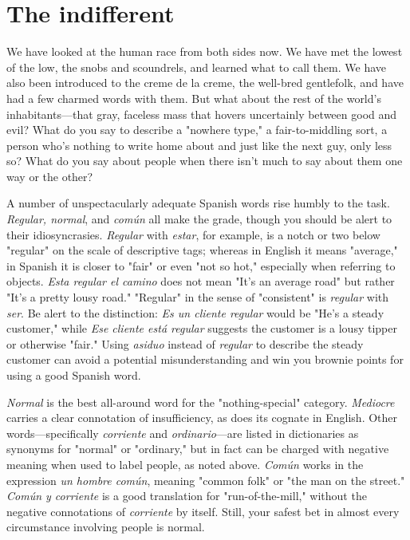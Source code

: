 \documentclass[14pt,a4paper,oneside]{memoir}
\begin{document}
\section{The indifferent}

We have looked at the human race from both sides now. We
have met the lowest of the low, the snobs and scoundrels, and learned
what to call them. We have also been introduced to the creme de la
creme, the well-bred gentlefolk, and have had a few charmed words
with them. But what about the rest of the world's inhabitants---that
gray, faceless mass that hovers uncertainly between good and evil?
What do you say to describe a "nowhere type," a fair-to-middling sort,
a person who's nothing to write home about and just like the next guy,
only less so? What do you say about people when there isn't much to
say about them one way or the other?

A number of unspectacularly adequate Spanish words rise
humbly to the task. \emph{Regular, normal}, and \emph{común} all make the grade,
though you should be alert to their idiosyncrasies. \emph{Regular} with \emph{estar},
for example, is a notch or two below "regular" on the scale of descriptive tags; whereas in English it means "average," in Spanish it is closer
to "fair" or even "not so hot," especially when referring to objects.
\emph{Esta regular el camino} does not mean "It's an average road" but rather
"It's a pretty lousy road." "Regular" in the sense of "consistent" is
\emph{regular} with \emph{ser}. Be alert to the distinction: \emph{Es un cliente regular}
would be "He's a steady customer," while \emph{Ese cliente está regular} suggests the customer is a lousy tipper or otherwise "fair." Using \emph{asiduo}
instead of \emph{regular} to describe the steady customer can avoid a potential
misunderstanding and win you brownie points for using a good Spanish word.

\emph{Normal} is the best all-around word for the "nothing-special"
category. \emph{Mediocre} carries a clear connotation of insufficiency, as does
its cognate in English. Other words---specifically \emph{corriente} and \emph{ordinario}---are listed in dictionaries as synonyms for "normal" or "ordinary,"
but in fact can be charged with negative meaning when used to label
people, as noted above. \emph{Común} works in the expression \emph{un hombre común}, meaning "common folk" or "the man on the street." \emph{Común y
corriente} is a good translation for "run-of-the-mill," without the negative connotations of \emph{corriente} by itself. Still, your safest bet in almost
every circumstance involving people is normal.
\end{document}
